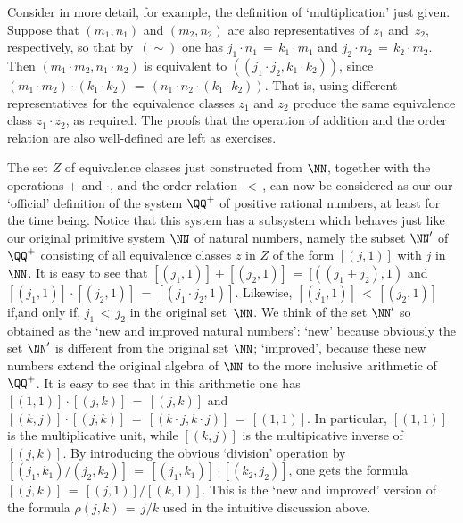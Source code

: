 {{{    Consider in more detail, for example, the definition of `multiplication' just given.
    Suppose that $(m_{1}, n_{1})$ and $(m_{2}, n_{2})$ are also representatives of $z_{1}$ and~$z_{2}$, respectively,
    so that by~$(\sim)$ one has $j_{1}{\cdot}n_{1} \,=\, k_{1}{\cdot}m_{1}$ and $j_{2}{\cdot}n_{2} \,=\, k_{2}{\cdot}m_{2}$.
    Then $(m_{1}{\cdot}m_{2},n_{1}{\cdot}n_{2})$ is equivalent to $((j_{1}{\cdot}j_{2}, k_{1}{\cdot}k_{2}))$,
    since $(m_{1}{\cdot}m_{2}){\cdot}(k_{1}{\cdot}k_{2}) \,=\, (n_{1}{\cdot}n_{2}{\cdot}(k_{1}{\cdot}k_{2}))$.
    That is, using different representatives for the equivalence classes $z_{1}$ and $z_{2}$ produce the same equivalence class $z_{1}{\cdot}z_{2}$, as required.
    The proofs that the operation of addition and the order relation are also well-defined are left as exercises.


        The set $Z$ of equivalence classes just constructed from ${\NN}$, together with the operations $+$ and ${\cdot}$, and the order relation $\,<\,$,
    can now  be considered as our our `official' definition of the system ${\QQ}^{+}$ of positive rational numbers, at least for the time being.
    Notice that this system has a subsystem which behaves just like our original primitive system ${\NN}$ of natural numbers,
    namely the subset ${\NN}'$ of ${\QQ}^{+}$ consisting of all equivalence classes $z$ in $Z$ of the form $[(j,1)]$ with $j$ in ${\NN}$.
    It is easy to see that $[(j_{1},1)] + [(j_{2},1)] \,=\, [((j_{1}+j_{2}),1)$ and $[(j_{1},1)]{\cdot}[(j_{2},1)] \,=\, [(j_{1}{\cdot}j_{2},1)]$.
    Likewise, $[(j_{1},1)]\,<\,[(j_{2},1)]$ if,and only if, $j_{1}\,<\,j_{2}$ in the original set~${\NN}$.
    We think of the set ${\NN}'$ so obtained as the `new and improved natural numbers':
    `new' because obviously the set ${\NN}'$ is different from the original set ${\NN}$;
    `improved', because these new numbers extend the original algebra of ${\NN}$ to the more inclusive arithmetic of~${\QQ}^{+}$.
    It is easy to see that in this arithmetic one has $[(1,1)]{\cdot}[(j,k)] \,=\, [(j,k)]$
    and $[(k,j)]{\cdot}[(j,k)] \,=\, [(k{\cdot}j,k{\cdot}j)] \,=\, [(1,1)]$. In particular,
    $[(1,1)]$ is the multiplicative unit, while $[(k,j)]$ is the multipicative inverse of $[(j,k)]$.
    By introducing the obvious `division' operation by $[(j_{1},k_{1})/(j_{2},k_{2})] \,=\, [(j_{1},k_{1})]{\cdot}[(k_{2},j_{2})]$,
    one gets the formula $[(j,k)] \,=\, [(j,1)]/[(k,1)]$. This is the `new and improved'
    version of the formula ${\rho}(j,k) \,=\, j/k$ used in the intuitive discussion above.

}}}
